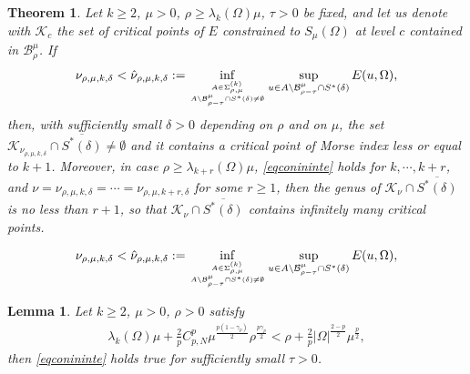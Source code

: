 \documentclass[10pt,a4paper]{amsart}
\newtheorem{theorem}{Theorem}
\newtheorem{lemma}{Lemma}
\newcommand{\B}{\mathcal{B}}
\newcommand{\K}{\mathcal{K}}
\newcommand{\ga}{\gamma}
\newcommand{\la}{\lambda}
\begin{document}
\begin{theorem} \label{thmgenus}
	Let $k \geq 2$, $\mu > 0$, $\rho \geq \la_k(\Omega)\mu$, $\tau > 0$ be fixed, and let us denote with $\K_c$ the set of critical points of $E$ constrained to $S_\mu(\Omega)$ at level $c$ contained in $\B_\rho^\mu$. If
	\begin{align} \label{eqconininte}
		\nu_{\rho,\mu,k,\delta} < \hat \nu_{\rho,\mu,k,\delta} := \inf_{A \in \Sigma_{\rho,\mu}^{(k)} \atop A \backslash \B_{\rho -\tau}^\mu \cap S^*(\delta) \neq \emptyset} \sup_{u \in A \backslash \B_{\rho -\tau}^\mu \cap S^*(\delta)}E(u,\Omega),
	\end{align}
    then, with sufficiently small $\delta > 0$ depending on $\rho$ and on $\mu$, the set $\K_{\nu_{\rho,\mu,k,\delta}} \cap \overline{S^*(\delta)} \neq \emptyset$ and it contains a critical point of Morse index less or equal to $k+1$. Moreover, in case $\rho \geq \la_{k+r}(\Omega)\mu$, \eqref{eqconininte} holds for $k, \cdots, k+r$, and $\nu = \nu_{\rho,\mu,k,\delta} = \cdots = \nu_{\rho,\mu,k+r,\delta}$ for some $r \ge 1$, then the genus of $\K_{\nu} \cap \overline{S^*(\delta)}$ is no less than $r+1$, so that $\K_{\nu} \cap \overline{S^*(\delta)}$ contains infinitely many critical points.
\end{theorem}

	\begin{align} 
		\nu_{\rho,\mu,k,\delta} < \hat \nu_{\rho,\mu,k,\delta} := \inf_{A \in \Sigma_{\rho,\mu}^{(k)} \atop A \backslash \B_{\rho -\tau}^\mu \cap S^*(\delta) \neq \emptyset} \sup_{u \in A \backslash \B_{\rho -\tau}^\mu \cap S^*(\delta)}E(u,\Omega),
	\end{align}

\begin{lemma} \label{lemsufficientcon}
	Let $k \geq 2$, $\mu > 0$, $\rho > 0$ satisfy
	\begin{align} \label{eqsufficientcon}
		\la_k(\Omega)\mu + \frac2p C_{p,N}^p \mu^{\frac{p(1-\ga_p)}{2}}\rho ^{\frac{p\ga_p}{2}} < \rho + \frac2p |\Omega|^{\frac{2-p}{2}}\mu^{\frac p2},
	\end{align}
	then \eqref{eqconininte} holds true for sufficiently small $\tau > 0$.
\end{lemma}
\end{document}
